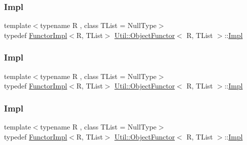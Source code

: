 \subsubsection{\texorpdfstring{Impl}{Impl}\hspace{0.1cm}{\footnotesize\ttfamily [1/3]}}
{\footnotesize\ttfamily template$<$typename R , class T\+List  = Null\+Type$>$ \\
typedef \mbox{\hyperlink{classUtil_1_1FunctorImpl}{Functor\+Impl}}$<$R, T\+List$>$ \mbox{\hyperlink{classUtil_1_1ObjectFunctor}{Util\+::\+Object\+Functor}}$<$ R, T\+List $>$\+::\mbox{\hyperlink{classUtil_1_1ObjectFunctor_a93fc635194d1d2768e73ba87d03abd8d}{Impl}}}

\mbox{\label{classUtil_1_1ObjectFunctor_a93fc635194d1d2768e73ba87d03abd8d}} 
\subsubsection{\texorpdfstring{Impl}{Impl}\hspace{0.1cm}{\footnotesize\ttfamily [2/3]}}
{\footnotesize\ttfamily template$<$typename R , class T\+List  = Null\+Type$>$ \\
typedef \mbox{\hyperlink{classUtil_1_1FunctorImpl}{Functor\+Impl}}$<$R, T\+List$>$ \mbox{\hyperlink{classUtil_1_1ObjectFunctor}{Util\+::\+Object\+Functor}}$<$ R, T\+List $>$\+::\mbox{\hyperlink{classUtil_1_1ObjectFunctor_a93fc635194d1d2768e73ba87d03abd8d}{Impl}}}

\mbox{\label{classUtil_1_1ObjectFunctor_a93fc635194d1d2768e73ba87d03abd8d}} 
\subsubsection{\texorpdfstring{Impl}{Impl}\hspace{0.1cm}{\footnotesize\ttfamily [3/3]}}
{\footnotesize\ttfamily template$<$typename R , class T\+List  = Null\+Type$>$ \\
typedef \mbox{\hyperlink{classUtil_1_1FunctorImpl}{Functor\+Impl}}$<$R, T\+List$>$ \mbox{\hyperlink{classUtil_1_1ObjectFunctor}{Util\+::\+Object\+Functor}}$<$ R, T\+List $>$\+::\mbox{\hyperlink{classUtil_1_1ObjectFunctor_a93fc635194d1d2768e73ba87d03abd8d}{Impl}}}

